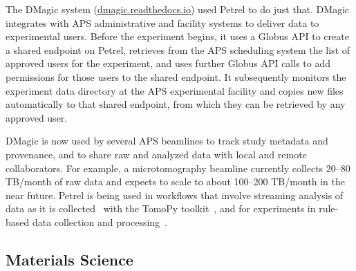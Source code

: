 \documentclass[sigconf]{acmart}
\begin{document}
The DMagic system (\url{dmagic.readthedocs.io}) used Petrel to do just that. %
DMagic integrates with APS administrative and facility systems to deliver data to experimental users.
Before the experiment begins,
it uses a Globus API to create a shared endpoint on Petrel,
retrieves from the APS scheduling system 
the list of approved users for the experiment, and uses further Globus API calls to
add permissions for those users to the shared endpoint.
It subsequently monitors the experiment data directory at the APS experimental facility and copies
new files automatically to that shared endpoint,
from which they can be retrieved by any approved user.

DMagic is now used by several APS beamlines to
track study metadata and provenance, 
and to share raw and analyzed data with local and remote collaborators.
For example, a
microtomography beamline currently collects 20--80 TB/month of raw data and expects to scale to about 100--200 TB/month in the near future. 
Petrel is being used in workflows that involve streaming analysis of data as it is collected~\cite{bicer2016optimization} with the TomoPy toolkit~\cite{gursoy2014tomopy},
and for experiments in rule-based data collection and processing~\cite{chard2017ripple}. 



\subsection{Materials Science}
\end{document}
